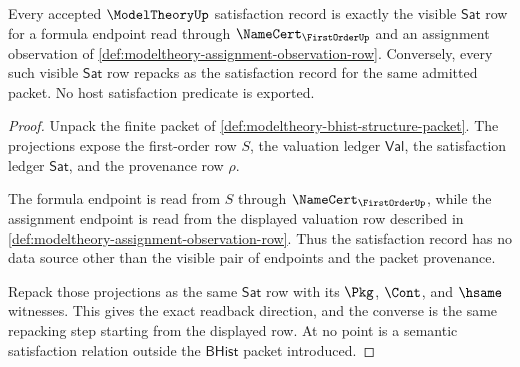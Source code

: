 \begin{theorem}\label{thm:modeltheory-satisfaction-exactness-row}
Every accepted $\ModelTheoryUp$ satisfaction record is exactly the visible
$\mathsf{Sat}$ row for a formula endpoint read through
$\NameCert_{\FirstOrderUp}$ and an assignment observation of
\autoref{def:modeltheory-assignment-observation-row}. Conversely, every such
visible $\mathsf{Sat}$ row repacks as the satisfaction record for the same
admitted packet. No host satisfaction predicate is exported.
\end{theorem}
\begin{proof}
Unpack the finite packet of
\autoref{def:modeltheory-bhist-structure-packet}. The projections expose the
first-order row $S$, the valuation ledger $\mathsf{Val}$, the satisfaction
ledger $\mathsf{Sat}$, and the provenance row $\rho$.

The formula endpoint is read from $S$ through
$\NameCert_{\FirstOrderUp}$, while the assignment endpoint is read from the
displayed valuation row described in
\autoref{def:modeltheory-assignment-observation-row}. Thus the satisfaction
record has no data source other than the visible pair of endpoints and the
packet provenance.

Repack those projections as the same $\mathsf{Sat}$ row with its $\Pkg$,
$\Cont$, and $\hsame$ witnesses. This gives the exact readback direction, and
the converse is the same repacking step starting from the displayed row. At
no point is a semantic satisfaction relation outside the $\mathsf{BHist}$
packet introduced.
\end{proof}

